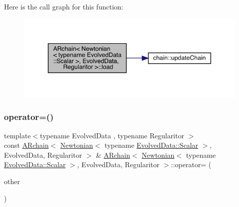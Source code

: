 Here is the call graph for this function\+:
\nopagebreak
\begin{figure}[H]
\begin{center}
\leavevmode
\includegraphics[width=346pt]{class_a_rchain_3_01_newtonian_3_01typename_01_evolved_data_1_1_scalar_01_4_00_01_evolved_data_00_01_regularitor_01_4_a8e7bc5b32dbd7a0c9c3541f17fa54e28_cgraph}
\end{center}
\end{figure}
\mbox{\label{class_a_rchain_3_01_newtonian_3_01typename_01_evolved_data_1_1_scalar_01_4_00_01_evolved_data_00_01_regularitor_01_4_a577ecdf4e934627257a0824d59404831}} 
\subsubsection{\texorpdfstring{operator=()}{operator=()}}
{\footnotesize\ttfamily template$<$typename Evolved\+Data , typename Regularitor $>$ \\
const \mbox{\hyperlink{class_a_rchain}{A\+Rchain}}$<$ \mbox{\hyperlink{class_newtonian}{Newtonian}}$<$ typename \mbox{\hyperlink{class_a_rchain_a707e42a79e4744424a34c9007e84ee07}{Evolved\+Data\+::\+Scalar}} $>$, Evolved\+Data, Regularitor $>$ \& \mbox{\hyperlink{class_a_rchain}{A\+Rchain}}$<$ \mbox{\hyperlink{class_newtonian}{Newtonian}}$<$ typename \mbox{\hyperlink{class_a_rchain_a707e42a79e4744424a34c9007e84ee07}{Evolved\+Data\+::\+Scalar}} $>$, Evolved\+Data, Regularitor $>$\+::operator= (\begin{DoxyParamCaption}\item[{const \mbox{\hyperlink{class_a_rchain}{A\+Rchain}}$<$ \mbox{\hyperlink{class_newtonian}{Newtonian}}$<$ typename \mbox{\hyperlink{class_a_rchain_a707e42a79e4744424a34c9007e84ee07}{Evolved\+Data\+::\+Scalar}} $>$, Evolved\+Data, Regularitor $>$ \&}]{other }\end{DoxyParamCaption})}

